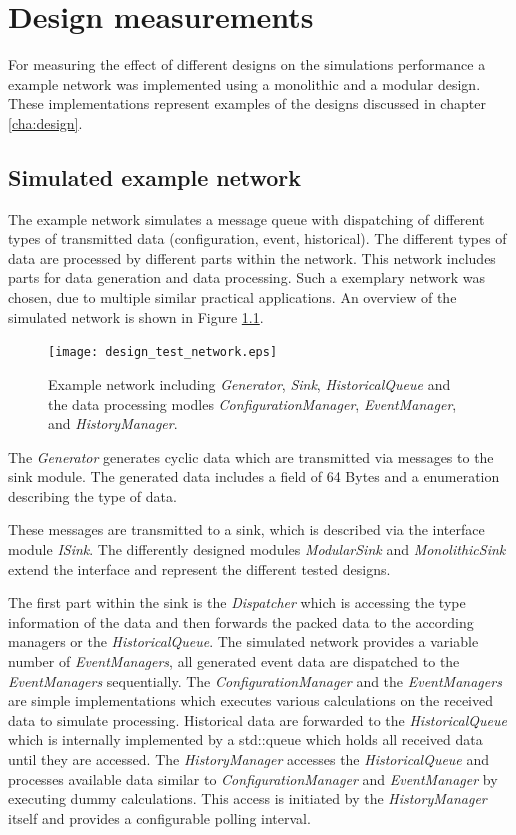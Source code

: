 \chapter{Design measurements}
\label{cha:measurements}
For measuring the effect of different designs on the simulations performance a example network was implemented using a monolithic and a modular design.
These implementations represent examples of the designs discussed in chapter \ref{cha:design}.


\section{Simulated example network}
\label{sec:measurements_network}
The example network simulates a message queue with dispatching of different types of transmitted data (configuration, event, historical).
The different types of data are processed by different parts within the network.
This network includes parts for data generation and data processing.
Such a exemplary network was chosen, due to multiple similar practical applications.
An overview of the simulated network is shown in Figure \ref{fig:design_test_network}.

\begin{figure}
    \centering
    \texttt{[image: design\_test\_network.eps]}
    \caption{Example network including \emph{Generator}, \emph{Sink}, \emph{HistoricalQueue} and the data processing modles \emph{ConfigurationManager}, \emph{EventManager}, and \emph{HistoryManager}.}
    \label{fig:design_test_network}
\end{figure}

The \emph{Generator} generates cyclic data which are transmitted via messages to the sink module.
The generated data includes a field of 64 Bytes and a enumeration describing the type of data.

These messages are transmitted to a sink, which is described via the interface module \emph{ISink}.
The differently designed modules \emph{ModularSink} and \emph{MonolithicSink} extend the interface and represent the different tested designs.

The first part within the sink is the \emph{Dispatcher} which is accessing the type information of the data and then forwards the packed data to the according managers or the \emph{HistoricalQueue}.
The simulated network provides a variable number of \emph{EventManagers}, all generated event data are dispatched to the \emph{EventManagers} sequentially.
The \emph{ConfigurationManager} and the \emph{EventManagers} are simple implementations which executes various calculations on the received data to simulate processing.
Historical data are forwarded to the \emph{HistoricalQueue} which is internally implemented by a std::queue which holds all received data until they are accessed.
The \emph{HistoryManager} accesses the \emph{HistoricalQueue} and processes available data similar to \emph{ConfigurationManager} and \emph{EventManager} by executing dummy calculations.
This access is initiated by the \emph{HistoryManager} itself and provides a configurable polling interval.
\\

